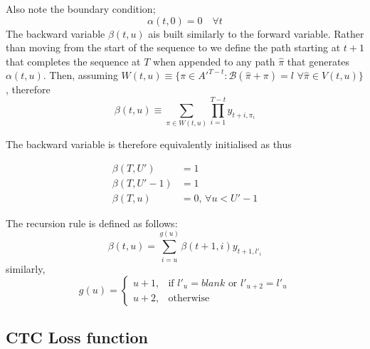 Also note the boundary condition;
\begin{equation}
\alpha(t, 0) = 0 \quad \forall t
\label{eqn_c3_ctc08}
\end{equation}
The backward variable $\beta(t,u)$ ais built similarly to the forward variable. Rather than moving from the start of the sequence to  we define the path starting at $t + 1$ that completes the sequence at $T$ when appended to any path $\hat{\pi}$ that generates $\alpha(t,u)$. Then, assuming $W(t,u) \equiv \{ \pi \in A'^{T-t} : \mathcal{B}(\hat{\pi} + \pi) = l \, \, \forall \hat{\pi} \in V(t,u) \}$, therefore
\begin{equation}
\beta(t,u) \equiv \sum_{\pi \in W(t,u)} \prod_{i=1}^{T - t} y_{t + i,\pi_i} \label{eqn_c3_ctc08}\end{equation}

The backward variable is therefore equivalently initialised as thus

\begin{equation} \begin{aligned}
\beta(T, U') &= 1 \\
\beta(T, U' - 1) &= 1 \\
\beta(T, u) &= 0, \, \forall u < U' - 1
\end{aligned}\label{eqn_c3_ctc09}\end{equation}

The recursion rule is defined as follows:
\begin{equation}
\beta(t, u) = \sum_{i = u}^{g(u)} \beta(t+1, i) y_{t+1, l'_i}\label{eqn_c3_ctc10}\end{equation}
similarly,
\begin{equation}
g(u) = \begin{cases} u + 1,& \text{if } l'_u = blank \text{ or } l'_{u+2} = l'_{u} \\ u + 2,& \text{otherwise} \end{cases}   
\end{equation}

\subsection{CTC Loss function}\label{sec_c4_ctcloss}

